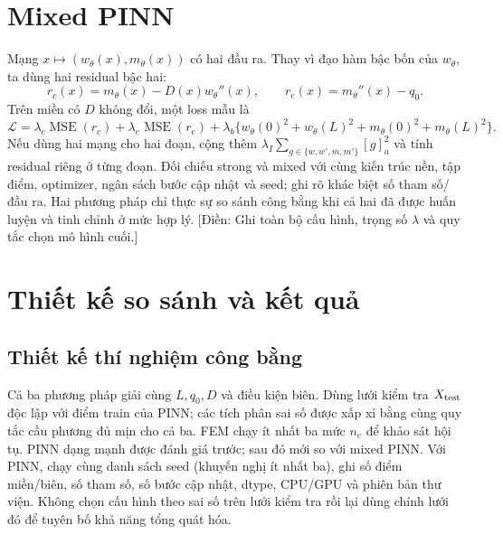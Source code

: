 \documentclass[12pt,a4paper]{article}
\newcommand{\todo}[1]{\textcolor{red!70!black}{[Điền: #1]}}
\begin{document}
\section{Mixed PINN}
Mạng $x\mapsto(w_\theta(x),m_\theta(x))$ có hai đầu ra. Thay vì đạo hàm bậc bốn của $w_\theta$, ta dùng hai residual bậc hai:
\begin{equation}\label{eq:mixed}
 r_c(x)=m_\theta(x)-D(x)w_\theta''(x),\qquad
 r_e(x)=m_\theta''(x)-q_0.
\end{equation}
Trên miền có $D$ không đổi, một loss mẫu là
\begin{equation}\label{eq:loss}
 \mathcal L=\lambda_c\operatorname{MSE}(r_c)
 +\lambda_e\operatorname{MSE}(r_e)
 +\lambda_b\{w_\theta(0)^2+w_\theta(L)^2+m_\theta(0)^2+m_\theta(L)^2\}.
\end{equation}
Nếu dùng hai mạng cho hai đoạn, cộng thêm $\lambda_I\sum_{g\in\{w,w',m,m'\}}[g]_a^2$ và tính residual riêng ở từng đoạn. Đối chiếu strong và mixed với cùng kiến trúc nền, tập điểm, optimizer, ngân sách bước cập nhật và seed; ghi rõ khác biệt số tham số/đầu ra. Hai phương pháp chỉ thực sự so sánh công bằng khi cả hai đã được huấn luyện và tinh chỉnh ở mức hợp lý. \todo{Ghi toàn bộ cấu hình, trọng số $\lambda$ và quy tắc chọn mô hình cuối.}

\section{Thiết kế so sánh và kết quả}
\subsection{Thiết kế thí nghiệm công bằng}
Cả ba phương pháp giải cùng $L,q_0,D$ và điều kiện biên. Dùng lưới kiểm tra $X_{\rm test}$ độc lập với điểm train của PINN; các tích phân sai số được xấp xỉ bằng cùng quy tắc cầu phương đủ mịn cho cả ba. FEM chạy ít nhất ba mức $n_e$ để khảo sát hội tụ. PINN dạng mạnh được đánh giá trước; sau đó mới so với mixed PINN. Với PINN, chạy cùng danh sách seed (khuyến nghị ít nhất ba), ghi số điểm miền/biên, số tham số, số bước cập nhật, dtype, CPU/GPU và phiên bản thư viện. Không chọn cấu hình theo sai số trên lưới kiểm tra rồi lại dùng chính lưới đó để tuyên bố khả năng tổng quát hóa.
\end{document}
